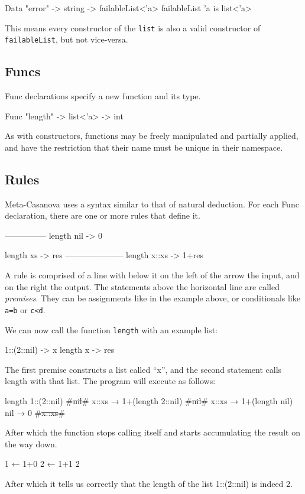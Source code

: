   \begin{code}
  Data "error" -> string -> failableList<'a>
  failableList 'a is list<'a>
  \end{code}

  \noindent
  This means every constructor of the \verb|list| is also a valid constructor of \verb|failableList|, but not vice-versa.

  \subsection{Funcs}
  Func declarations specify a new function and its type.

  \begin{code}
  Func "length" -> list<'a> -> int
  \end{code}

  As with constructors, functions may be freely manipulated and partially applied, and have the restriction that their name must be unique in their namespace.

  \subsection{Rules}
  Meta-Casanova uses a syntax similar to that of natural deduction.
  For each Func declaration, there are one or more rules that define it.

  \begin{code}
  ---------------
  length nil -> 0

  length xs -> res
  ---------------------
  length x::xs -> 1+res
  \end{code}
  
  A rule is comprised of a line with below it on the left of the arrow the input, and on the right the output.
  The statements above the horizontal line are called \textit{premises}.
  They can be assignments like in the example above, or conditionals like \verb|a=b| or \verb|c<d|.

  We can now call the function \verb|length| with an example list:

  \begin{code}
    1::(2::nil) -> x
    length x    -> res
  \end{code}

  The first premise constructs a list called ``x'', and the second statement calls length with that list.
  The program will execute as follows:

  \begin{code}
  length 1::(2::nil)
      #\st{nil}#
      x::xs → 1+(length 2::nil)
          #\st{nil}#
          x::xs → 1+(length nil)
              nil → 0
              #\st{x::xs}#
  \end{code}

  \noindent
  After which the function stops calling itself and starts accumulating the result on the way down.
  
  \begin{code}[gobble=2]
          1 ← 1+0
      2 ← 1+1
  2
  \end{code}

  \noindent
  After which it tells us correctly that the length of the list 1::(2::nil) is indeed 2.

